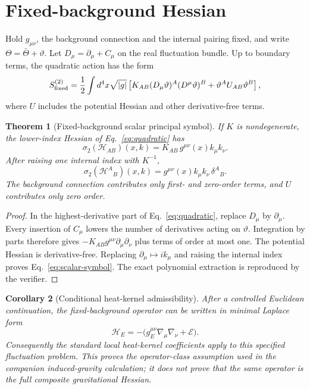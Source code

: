 \documentclass[11pt,a4paper]{article}
\newtheorem{theorem}{Theorem}
\newtheorem{corollary}[theorem]{Corollary}
\newcommand{\Hess}{\mathcal H}
\begin{document}
\section{Fixed-background Hessian}
Hold $g_{\mu\nu}$, the background connection and the internal pairing fixed,
and write $\Theta=\bar\Theta+\vartheta$.  Let
$D_\mu=\partial_\mu+C_\mu$ on the real fluctuation bundle.  Up to boundary
terms, the quadratic action has the form
\begin{equation}
 S^{(2)}_{\rm fixed}
 =\frac12\int d^4x\sqrt{|g|}\left[
 K_{AB}(D_\mu\vartheta)^A(D^\mu\vartheta)^B
 +\vartheta^A U_{AB}\vartheta^B\right],
 \label{eq:quadratic}
\end{equation}
where $U$ includes the potential Hessian and other derivative-free terms.

\begin{theorem}[Fixed-background scalar principal symbol]
\label{thm:fixed}
If $K$ is nondegenerate, the lower-index Hessian of
Eq.~\eqref{eq:quadratic} has
\begin{equation}
 \sigma_2(\Hess_{AB})(x,k)
 =K_{AB}\,g^{\mu\nu}(x)k_\mu k_\nu.
 \label{eq:lower-symbol}
\end{equation}
After raising one internal index with $K^{-1}$,
\begin{equation}
 \boxed{\sigma_2(\Hess^A{}_B)(x,k)
 =g^{\mu\nu}(x)k_\mu k_\nu\,\delta^A{}_B.}
 \label{eq:scalar-symbol}
\end{equation}
The background connection contributes only first- and zero-order terms, and
$U$ contributes only zero order.
\end{theorem}

\begin{proof}
In the highest-derivative part of Eq.~\eqref{eq:quadratic}, replace
$D_\mu$ by $\partial_\mu$.  Every insertion of $C_\mu$ lowers the number of
derivatives acting on $\vartheta$.  Integration by parts therefore gives
$-K_{AB}g^{\mu\nu}\partial_\mu\partial_\nu$ plus terms of order at most one.
The potential Hessian is derivative-free.  Replacing
$\partial_\mu\mapsto ik_\mu$ and raising the internal index proves
Eq.~\eqref{eq:scalar-symbol}.  The exact polynomial extraction is reproduced
by the verifier.
\end{proof}

\begin{corollary}[Conditional heat-kernel admissibility]
After a controlled Euclidean continuation, the fixed-background operator can
be written in minimal Laplace form
\begin{equation}
 \Hess_E=-\bigl(g_E^{\mu\nu}\nabla_\mu\nabla_\nu+\mathcal E\bigr).
\end{equation}
Consequently the standard local heat-kernel coefficients apply to this
specified fluctuation problem.  This proves the operator-class assumption
used in the companion induced-gravity calculation; it does not prove that the
same operator is the full composite gravitational Hessian.
\end{corollary}
\end{document}
